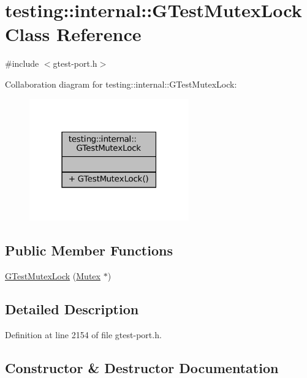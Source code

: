 \hypertarget{classtesting_1_1internal_1_1GTestMutexLock}{}\section{testing\+:\+:internal\+:\+:G\+Test\+Mutex\+Lock Class Reference}
\label{classtesting_1_1internal_1_1GTestMutexLock}


{\ttfamily \#include $<$gtest-\/port.\+h$>$}



Collaboration diagram for testing\+:\+:internal\+:\+:G\+Test\+Mutex\+Lock\+:
\nopagebreak
\begin{figure}[H]
\begin{center}
\leavevmode
\includegraphics[width=195pt]{classtesting_1_1internal_1_1GTestMutexLock__coll__graph}
\end{center}
\end{figure}
\subsection*{Public Member Functions}
\begin{DoxyCompactItemize}
\item 
\hyperlink{classtesting_1_1internal_1_1GTestMutexLock_a77e3cba326d5356b4a1dea3790559c26}{G\+Test\+Mutex\+Lock} (\hyperlink{classtesting_1_1internal_1_1Mutex}{Mutex} $\ast$)
\end{DoxyCompactItemize}


\subsection{Detailed Description}


Definition at line 2154 of file gtest-\/port.\+h.



\subsection{Constructor \& Destructor Documentation}
\mbox{\label{classtesting_1_1internal_1_1GTestMutexLock_a77e3cba326d5356b4a1dea3790559c26}} 
